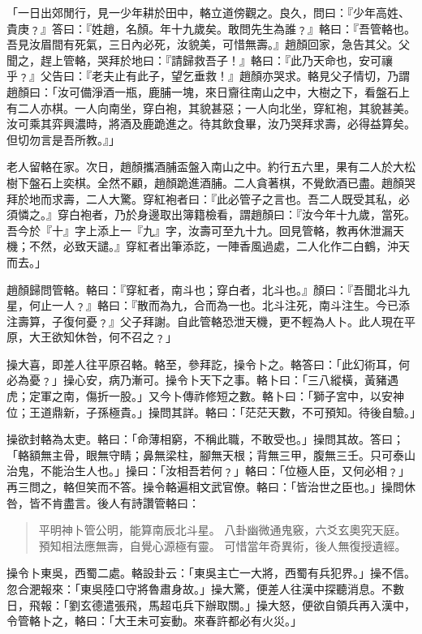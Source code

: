 「一日出郊閒行，見一少年耕於田中，輅立道傍觀之。良久，問曰：『少年高姓、貴庚﹖』答曰：『姓趙，名顏。年十九歲矣。敢問先生為誰﹖』輅曰：『吾管輅也。吾見汝眉間有死氣，三日內必死，汝貌美，可惜無壽。』趙顏回家，急告其父。父聞之，趕上管輅，哭拜於地曰：『請歸救吾子！』輅曰：『此乃天命也，安可禳乎﹖』父告曰：『老夫止有此子，望乞垂救！』趙顏亦哭求。輅見父子情切，乃謂趙顏曰：「汝可備淨酒一瓶，鹿脯一塊，來日齎往南山之中，大樹之下，看盤石上有二人亦棋。一人向南坐，穿白袍，其貌甚惡；一人向北坐，穿紅袍，其貌甚美。汝可乘其弈興濃時，將酒及鹿跪進之。待其飲食畢，汝乃哭拜求壽，必得益算矣。但切勿言是吾所教。』」

老人留輅在家。次日，趙顏攜酒脯盃盤入南山之中。約行五六里，果有二人於大松樹下盤石上奕棋。全然不顧，趙顏跪進酒脯。二人貪著棋，不覺飲酒已盡。趙顏哭拜於地而求壽，二人大驚。穿紅袍者曰：『此必管子之言也。吾二人既受其私，必須憐之。』穿白袍者，乃於身邊取出簿籍檢看，謂趙顏曰：『汝今年十九歲，當死。吾今於『十』字上添上一『九』字，汝壽可至九十九。回見管輅，教再休泄漏天機；不然，必致天譴。』穿紅者出筆添訖，一陣香風過處，二人化作二白鶴，沖天而去。」

趙顏歸問管輅。輅曰：『穿紅者，南斗也；穿白者，北斗也。』顏曰：『吾聞北斗九星，何止一人﹖』輅曰：『散而為九，合而為一也。北斗注死，南斗注生。今已添注壽算，子復何憂﹖』父子拜謝。自此管輅恐泄天機，更不輕為人卜。此人現在平原，大王欲知休咎，何不召之﹖」

操大喜，即差人往平原召輅。輅至，參拜訖，操令卜之。輅答曰：「此幻術耳，何必為憂﹖」操心安，病乃漸可。操令卜天下之事。輅卜曰：「三八縱橫，黃豬遇虎；定軍之南，傷折一股。」又今卜傳祚修短之數。輅卜曰：「獅子宮中，以安神位；王道鼎新，子孫極貴。」操問其詳。輅曰：「茫茫天數，不可預知。待後自驗。」

操欲封輅為太吏。輅曰：「命薄相窮，不稱此職，不敢受也。」操問其故。答曰；「輅額無主骨，眼無守睛；鼻無梁柱，腳無天根；背無三甲，腹無三壬。只可泰山治鬼，不能治生人也。」操曰：「汝相吾若何﹖」輅曰：「位極人臣，又何必相﹖」再三問之，輅但笑而不答。操令輅遍相文武官僚。輅曰：「皆治世之臣也。」操問休咎，皆不肯盡言。後人有詩讚管輅曰：

\begin{quote}
平明神卜管公明，能算南辰北斗星。
八卦幽微通鬼竅，六爻玄奧究天庭。
預知相法應無壽，自覺心源極有靈。
可惜當年奇異術，後人無復授遺經。
\end{quote}

操令卜東吳，西蜀二處。輅設卦云：「東吳主亡一大將，西蜀有兵犯界。」操不信。忽合淝報來：「東吳陸口守將魯肅身故。」操大驚，便差人往漢中探聽消息。不數日，飛報：「劉玄德遣張飛，馬超屯兵下辦取關。」操大怒，便欲自領兵再入漢中，令管輅卜之，輅曰：「大王未可妄動。來春許都必有火災。」

